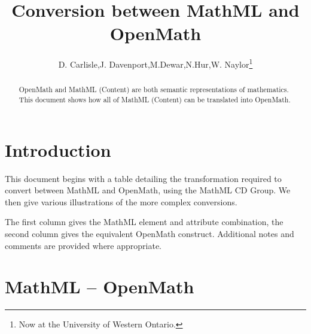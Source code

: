 \documentclass[twoside,11pt]{article}
\begin{document}
\title{Conversion between MathML and  OpenMath}
\author{D. Carlisle,J. Davenport,M.Dewar,N.Hur,W. Naylor\thanks{Now at the University of Western Ontario.}}
\begin{abstract}
OpenMath and MathML (Content) are both semantic representations of
mathematics. This document shows how all of MathML (Content) can be
translated into OpenMath.
\end{abstract}
\maketitle
\newenvironment{mybox}[1]{
\begin{tabular}{|c|}
\hline
\begin{minipage}[t]{#1}}{
\end{minipage}\\
\hline
\end{tabular}}
\newenvironment{myboxbopen}[1]{
\begin{tabular}{|c|}
\hline
\begin{minipage}[t]{#1}}{
\end{minipage}
\end{tabular}}
\newenvironment{myboxtopen}[1]{
\begin{tabular}{|c|}
\begin{minipage}[t]{#1}}{
\end{minipage}\\
\hline
\end{tabular}}
\section*{Introduction}
This document begins with a table detailing the transformation
required to convert between MathML and OpenMath, using the
MathML CD Group. We then give various illustrations of the more
complex conversions.

The first column gives the MathML element and attribute combination,
the second column gives the equivalent OpenMath construct.
Additional notes and comments are provided where appropriate.
\clearpage

\section*{MathML -- OpenMath}
\end{document}
